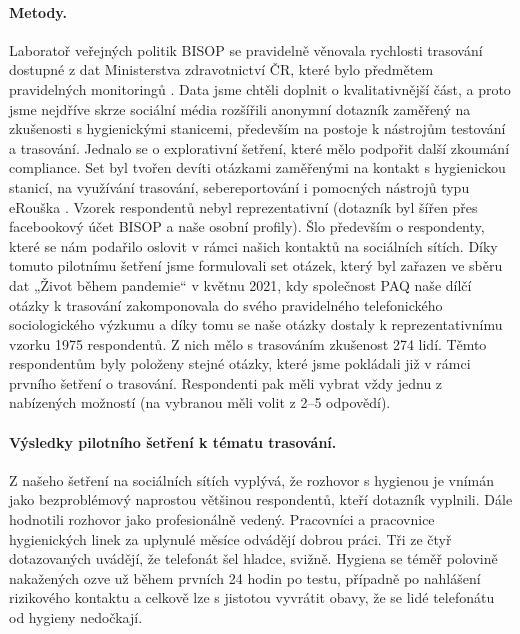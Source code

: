 \paragraph*{Metody.}
Laboratoř veřejných politik BISOP se pravidelně věnovala rychlosti trasování dostupné z dat Ministerstva zdravotnictví ČR, které bylo předmětem pravidelných monitoringů \cite{Blechova,Blechova2020}. Data jsme chtěli doplnit o kvalitativnější část, a proto jsme nejdříve skrze sociální média rozšířili anonymní dotazník zaměřený na zkušenosti s hygienickými stanicemi, především na postoje k nástrojům testování a trasování. Jednalo se o explorativní šetření, které mělo podpořit další zkoumání compliance. Set byl tvořen devíti otázkami zaměřenými na kontakt s hygienickou stanicí, na využívání trasování, sebereportování i pomocných nástrojů typu eRouška \cite{Erouska.cz2020}. Vzorek respondentů nebyl reprezentativní (dotazník byl šířen přes facebookový účet BISOP a naše osobní profily). Šlo především o respondenty, které se nám podařilo oslovit v rámci našich kontaktů na sociálních sítích. 
Díky tomuto pilotnímu šetření jsme formulovali set otázek, který byl zařazen ve sběru dat „Život během pandemie“ v květnu 2021, kdy společnost PAQ \cite{Prokop2021a} naše dílčí otázky k trasování zakomponovala do svého pravidelného telefonického sociologického výzkumu a díky tomu se naše otázky dostaly k reprezentativnímu vzorku 1975 respondentů. 
Z nich mělo s trasováním zkušenost 274 lidí. Těmto respondentům byly položeny stejné otázky, které jsme pokládali již v rámci prvního šetření o trasování. Respondenti pak měli vybrat vždy jednu z nabízených možností (na vybranou měli volit z 2--5 odpovědí). 

\paragraph*{Výsledky pilotního šetření k tématu trasování.}
Z našeho šetření na sociálních sítích vyplývá, že rozhovor s hygienou je vnímán jako bezproblémový naprostou většinou respondentů, kteří dotazník vyplnili. Dále hodnotili rozhovor jako profesionálně vedený. Pracovníci a pracovnice hygienických linek za uplynulé měsíce odvádějí dobrou práci. Tři ze čtyř dotazovaných uvádějí, že telefonát šel hladce, svižně. Hygiena se téměř polovině nakažených ozve už během prvních 24 hodin po testu, případně po nahlášení rizikového kontaktu a celkově lze s jistotou vyvrátit obavy, že se lidé telefonátu od hygieny nedočkají.


